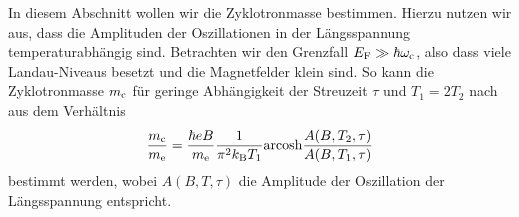 \documentclass[paper=a4,fontsize=10pt,DIV=18,twocolumn,parskip=half]{scrartcl}
\numberwithin{equation}{section}    %
\begin{document}
In diesem Abschnitt wollen wir die Zyklotronmasse bestimmen. Hierzu nutzen wir aus, dass die Amplituden der Oszillationen in der Längsspannung temperaturabhängig sind. Betrachten wir den Grenzfall $E_{\rm F} \gg \hbar\omega_{\rm c}$, also dass viele Landau-Niveaus besetzt und die Magnetfelder klein sind. So kann die Zyklotronmasse $m_{\rm c}$ für geringe Abhängigkeit der Streuzeit $\tau$ und $T_{1} = 2T_{2}$ nach~\citet{ando} aus dem Verhältnis
\begin{equation}
	\frac{m_{\rm c}}{m_{\rm e}} = \frac{\hbar e B}{m_{\rm e}} \frac{1}{\pi^2 k_{\rm B} T_{1}}\mathrm{arcosh}\frac{A(B,T_2,\tau)}{A(B,T_1,\tau)}
	\label{eq:zyklotronmasse}
\end{equation}
bestimmt werden, wobei $A(B,T,\tau)$ die Amplitude der Oszillation der Längsspannung entspricht.
\end{document}

